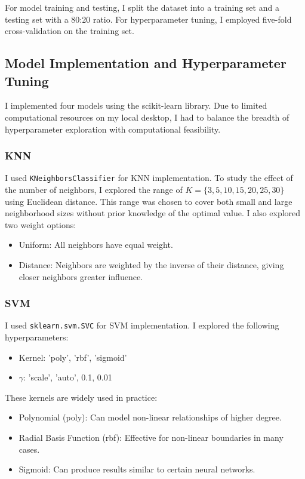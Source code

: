 \documentclass[conference]{IEEEtran}
\begin{document}
For model training and testing, I split the dataset into a training set and a testing set with a 80:20 ratio. For hyperparameter tuning, I employed five-fold cross-validation on the training set.

\subsection{Model Implementation and Hyperparameter Tuning \label{sec:data1-hyperparameter}}
I implemented four models using the scikit-learn library. Due to limited computational resources on my local desktop, I had to balance the breadth of hyperparameter exploration with computational feasibility.

\subsubsection{KNN \label{sec:knn}}
I used \verb|KNeighborsClassifier| for KNN implementation. To study the effect of the number of neighbors, I explored the range of $K = \{3, 5, 10, 15, 20, 25, 30\}$ using Euclidean distance. This range was chosen to cover both small and large neighborhood sizes without prior knowledge of the optimal value. I also explored two weight options:
\begin{itemize}
    \item Uniform: All neighbors have equal weight.
    \item Distance: Neighbors are weighted by the inverse of their distance, giving closer neighbors greater influence.
\end{itemize}

\subsubsection{SVM \label{sec:svm}}
I used \verb|sklearn.svm.SVC| for SVM implementation. I explored the following hyperparameters:
\begin{itemize}
    \item Kernel: 'poly', 'rbf', 'sigmoid'
    \item $\gamma$: 'scale', 'auto', 0.1, 0.01
\end{itemize}

These kernels are widely used in practice:
\begin{itemize}
    \item Polynomial (poly): Can model non-linear relationships of higher degree.
    \item Radial Basis Function (rbf): Effective for non-linear boundaries in many cases.
    \item Sigmoid: Can produce results similar to certain neural networks.
\end{itemize}
\end{document}
